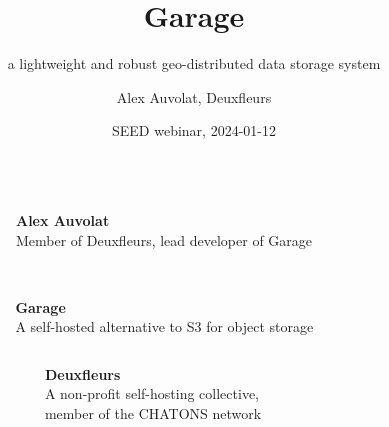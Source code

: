 \documentclass[aspectratio=169]{beamer}
\title{Garage}
\subtitle{a lightweight and robust geo-distributed data storage system}
\author{Alex Auvolat, Deuxfleurs}
\date{SEED webinar, 2024-01-12}
\begin{document}
% 
% 
% 

\begin{frame}
	\begin{columns}[t]
		\begin{column}{.2\textwidth}
			\centering
		\end{column}
		\begin{column}{.6\textwidth}
			\textbf{Alex Auvolat}\\
			Member of Deuxfleurs, lead developer of Garage
		\end{column}
		\begin{column}{.2\textwidth}
			~
		\end{column}
	\end{columns}
	\vspace{.5em}

	\begin{columns}[t]
		\begin{column}{.2\textwidth}
			\centering
		\end{column}
		\begin{column}{.6\textwidth}
			\\\textbf{Garage}\\
			A self-hosted alternative to S3 for object storage
		\end{column}
		\begin{column}{.2\textwidth}
			~
		\end{column}
	\end{columns}
	\vspace{2em}

	\begin{columns}[t]
		\begin{column}{.2\textwidth}
			\centering
		\end{column}
		\begin{column}{.6\textwidth}
			\textbf{Deuxfleurs}\\
			A non-profit self-hosting collective,\\
			member of the CHATONS network
		\end{column}
		\begin{column}{.2\textwidth}
			\centering
		\end{column}
	\end{columns}

\end{frame}
\end{document}
